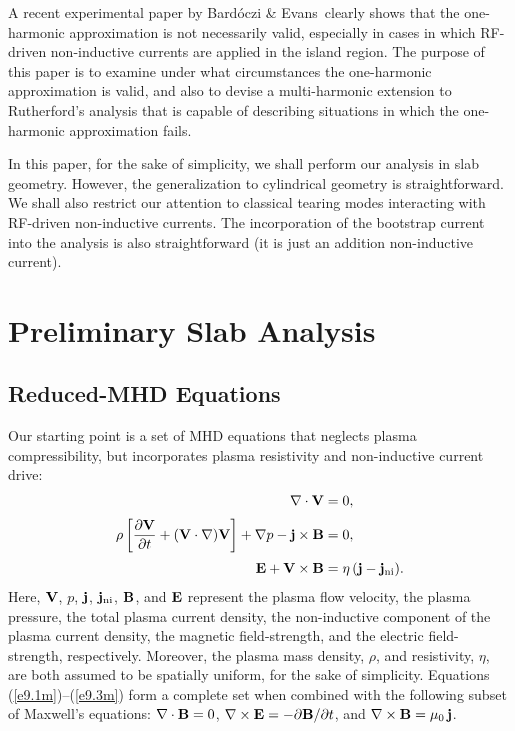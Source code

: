 \documentclass[12pt,prb,aps]{revtex4-1}
\begin{document}
A recent experimental paper by Bard\'{o}czi \& Evans\,\cite{bar} clearly shows that the one-harmonic
approximation is not necessarily valid, especially in cases in which RF-driven non-inductive
currents  are applied in the island region. 
The purpose of this paper is to examine under what circumstances the one-harmonic approximation is valid, and
also to devise a multi-harmonic extension to Rutherford's analysis that is capable of  describing situations in 
which the one-harmonic approximation fails. 

In this paper, for the sake of simplicity, we shall perform our analysis
in slab geometry. However, the generalization to cylindrical geometry is straightforward. We shall also restrict our attention to classical tearing modes interacting with RF-driven non-inductive currents. The incorporation of the
bootstrap current into the analysis is also straightforward (it is just an addition non-inductive current). 

\section{Preliminary Slab Analysis}
\subsection{Reduced-MHD Equations}
Our starting point is a set of MHD equations that neglects plasma compressibility,
but incorporates  plasma resistivity and non-inductive current drive: 
\begin{align}
\nabla\cdot{\bf V} &= 0,\label{e9.1m}\\[0.5ex]
\rho\left[\frac{\partial {\bf V}}{\partial t} + ({\bf V}\cdot\nabla) {\bf V}\right]+\nabla p-{\bf j}\times {\bf B} &=0,\label{e9.2m}\\[0,5ex]
{\bf E} + {\bf V} \times {\bf B} &=\eta\,({\bf j}-{\bf j}_{\rm ni}).\label{e9.3m}
\end{align}
Here, ${\bf V}$, $p$,   ${\bf j}$, ${\bf j}_{\rm ni}$, ${\bf B}$,  and ${\bf E}$  represent the plasma flow velocity, the plasma
pressure, the total plasma current density, 
the non-inductive component of the plasma current density, the magnetic field-strength, and the electric field-strength, respectively.  Moreover, the plasma mass density, $\rho$, and resistivity, $\eta$, are both assumed to be spatially uniform, for the sake of simplicity.  
Equations (\ref{e9.1m})--(\ref{e9.3m})  form a complete set when combined with the following subset of 
Maxwell's equations:
$\nabla\cdot{\bf B} =0$,
$ \nabla\times {\bf E}=-\partial{\bf B}/\partial t$, and $\nabla\times {\bf B} = \mu_0\,{\bf j}$.
 
\end{document}
